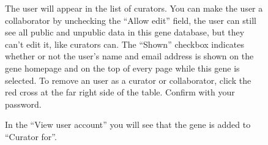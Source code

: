 \begin{figure}[ht]
  \begin{shaded}
  	\caption{The user will appear in the list of curators.
  	You can make the user a collaborator by unchecking the ``Allow edit'' field, 
  	 the user can still see all public and unpublic data in this gene database, but they can't edit it,
  	 like curators can.\newline 
		The ``Shown'' checkbox indicates whether or not the user's name and email address is shown
		 on the gene homepage and on the top of every page while this gene is selected.\newline
		To remove an user as a curator or collaborator, click the red cross at the far right side of the table.
  	Confirm with your password.}
	  \label{fig:make_user_curator_III}
  \end{shaded}
\end{figure}

\begin{figure}[ht]
  \begin{shaded}
  	\caption{In the ``View user account'' you will see that the gene is added to ``Curator for''.}
	  \label{fig:make_user_curator_IV}
  \end{shaded}
\end{figure}

